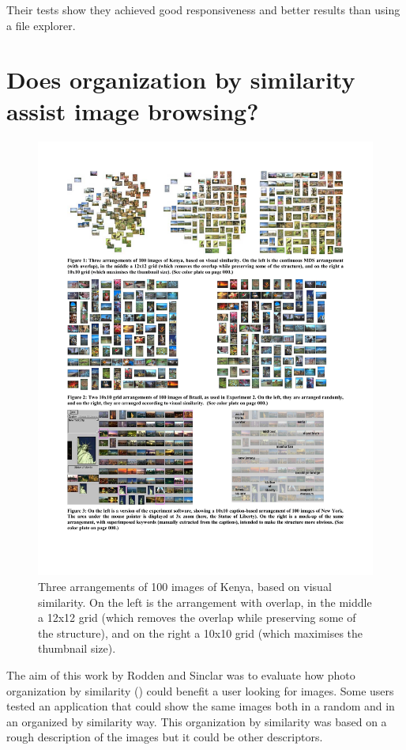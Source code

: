 Their tests show they achieved good responsiveness and better results than using a file explorer.


\section{Does organization by similarity assist image browsing?} %
\label{sub:Rodden}
\begin{figure}[ht]
	\centering
		\includegraphics[width=\textwidth]{imgs-RelatedWork/Rodden1}
	\caption{Three arrangements of 100 images of Kenya, based on visual similarity. On the left is the arrangement with overlap, in the middle a 12x12 grid (which removes the overlap while preserving some of the structure), and on the right a 10x10 grid (which maximises the thumbnail size).}
	\label{fig:Rodden1}
\end{figure}

The aim of this work by Rodden and Sinclar \cite{Rodden:2001p731} was to evaluate how photo organization by similarity () could benefit a user looking for images. Some users tested an application that could show the same images both in a random and in an organized by similarity way. This organization by similarity was based on a rough description of the images but it could be other descriptors.

